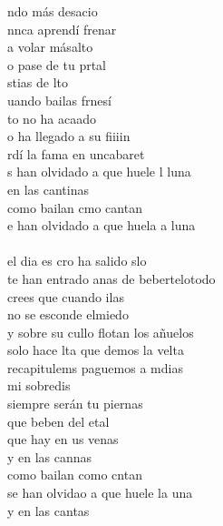 \begin{cancion}[Sirenas][Taburete]%
	ndo más desacio\\
	nnca aprendí  frenar\\
	 a volar másalto\\
	o pase de tu prtal\\
	stias de lto\\
	uando bailas frnesí\\
	to no ha acaado\\
	o ha llegado a su fiiiin\\
	rdí la fama en uncabaret\\
	s han olvidado a que huele l luna\\
	en las cantinas \\
	como bailan cmo cantan\\
	e han olvidado a que huela a luna\\
	\jump\\
	el dia es cro ha salido slo\\
	te han entrado anas de bebertelotodo\\
	crees que cuando ilas \\
	no se esconde elmiedo\\
	y sobre su cullo flotan los añuelos\\
	solo hace lta que demos la velta\\
	recapitulems paguemos a mdias\\
	mi sobredis \\
	siempre serán tu piernas\\
	que beben del etal \\
	que hay en us venas\\
	y en las cannas \\
	como bailan como cntan\\
	se han olvidao a que huele la una\\
	y en las cantas \\

\end{cancion}
